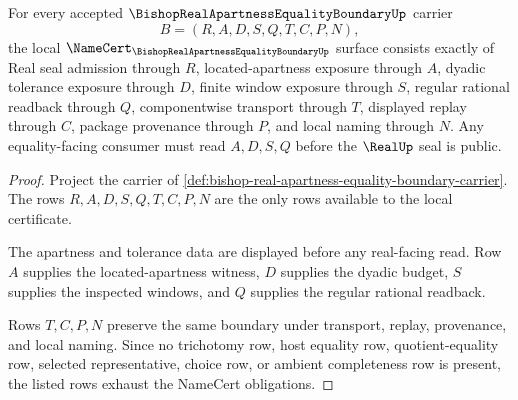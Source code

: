 \begin{theorem}
\label{thm:bishop-real-apartness-equality-boundary-namecert-obligations}
For every accepted $\BishopRealApartnessEqualityBoundaryUp$ carrier
$$
B=(R,A,D,S,Q,T,C,P,N),
$$
the local $\NameCert_{\BishopRealApartnessEqualityBoundaryUp}$ surface consists exactly of Real seal admission through $R$, located-apartness exposure through $A$, dyadic tolerance exposure through $D$, finite window exposure through $S$, regular rational readback through $Q$, componentwise transport through $T$, displayed replay through $C$, package provenance through $P$, and local naming through $N$. Any equality-facing consumer must read $A,D,S,Q$ before the $\RealUp$ seal is public.
\end{theorem}
\begin{proof}
Project the carrier of \autoref{def:bishop-real-apartness-equality-boundary-carrier}. The rows $R,A,D,S,Q,T,C,P,N$ are the only rows available to the local certificate.

The apartness and tolerance data are displayed before any real-facing read. Row $A$ supplies the located-apartness witness, $D$ supplies the dyadic budget, $S$ supplies the inspected windows, and $Q$ supplies the regular rational readback.

Rows $T,C,P,N$ preserve the same boundary under transport, replay, provenance, and local naming. Since no trichotomy row, host equality row, quotient-equality row, selected representative, choice row, or ambient completeness row is present, the listed rows exhaust the NameCert obligations.
\end{proof}

